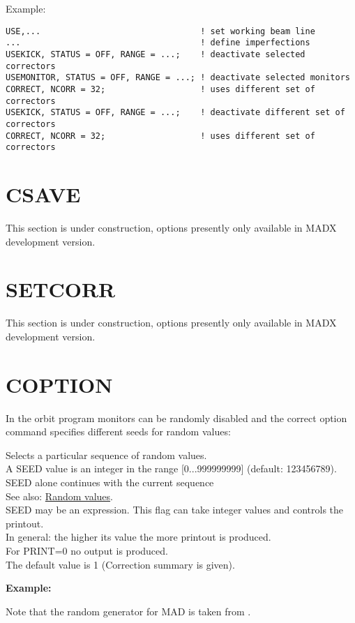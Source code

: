 Example:
\begin{verbatim}
USE,...                                ! set working beam line 
...                                    ! define imperfections 
USEKICK, STATUS = OFF, RANGE = ...;    ! deactivate selected correctors 
USEMONITOR, STATUS = OFF, RANGE = ...; ! deactivate selected monitors   
CORRECT, NCORR = 32;                   ! uses different set of correctors
USEKICK, STATUS = OFF, RANGE = ...;    ! deactivate different set of correctors 
CORRECT, NCORR = 32;                   ! uses different set of correctors
\end{verbatim}


%
\section{CSAVE}
\label{sec:csave}
 This section is under construction, options presently only available in
 MADX development version.  

\section{SETCORR}
\label{sec:setcorr}
 This section is under construction, options presently only available in
 MADX development version.  


% 
\section{COPTION}
\label{sec:coption}


In the orbit program monitors can be randomly disabled and the correct
option command specifies different seeds for random values:  

\begin{madlist}
    Selects a particular sequence of random values. 
     \\ A SEED value is an integer in the range [0...999999999] (default: 123456789). 
     \\ SEED alone continues with the current sequence 
     \\ See also: \href{../Introduction/expression.html#random}{Random values}. 
     \\ SEED may be an expression. 
    This flag can take integer values and controls the printout. 
     \\ In general: the higher its value the more printout is produced.  
     \\ For PRINT=0 no output is produced. 
     \\ The default value is 1 (Correction summary is given). 
\end{madlist}

{\bf Example:}

Note that the random generator for MAD is taken from \cite{knuth1981}.





